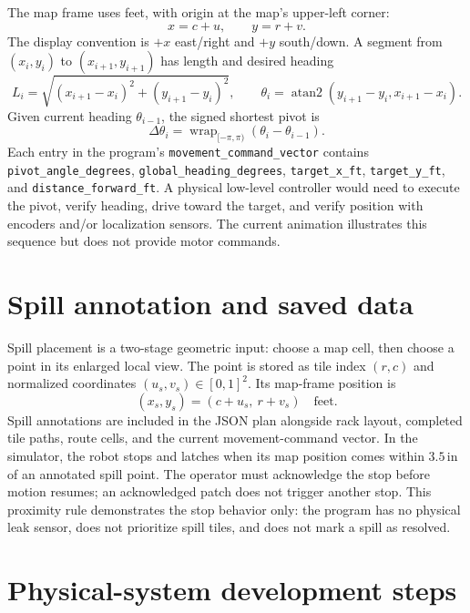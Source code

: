 \documentclass[11pt]{article}
\begin{document}
The map frame uses feet, with origin at the map's upper-left corner:
\[
  x=c+u,\qquad y=r+v.
\]
The display convention is $+x$ east/right and $+y$ south/down. A segment from
$(x_i,y_i)$ to $(x_{i+1},y_{i+1})$ has length and desired heading
\[
  L_i=\sqrt{(x_{i+1}-x_i)^2+(y_{i+1}-y_i)^2},\qquad
  \theta_i=\operatorname{atan2}(y_{i+1}-y_i,x_{i+1}-x_i).
\]
Given current heading $\theta_{i-1}$, the signed shortest pivot is
\[
  \Delta\theta_i=\operatorname{wrap}_{[-\pi,\pi)}(\theta_i-\theta_{i-1}).
\]
Each entry in the program's \texttt{movement\_command\_vector} contains
\texttt{pivot\_angle\_degrees}, \texttt{global\_heading\_degrees},
\texttt{target\_x\_ft}, \texttt{target\_y\_ft}, and
\texttt{distance\_forward\_ft}. A physical low-level controller would need
to execute the pivot, verify heading, drive toward the target, and verify
position with encoders and/or localization sensors. The current animation
illustrates this sequence but does not provide motor commands.

\section{Spill annotation and saved data}

Spill placement is a two-stage geometric input: choose a map cell, then choose
a point in its enlarged local view. The point is stored as tile index $(r,c)$
and normalized coordinates $(u_s,v_s)\in[0,1]^2$. Its map-frame position is
\[
  (x_s,y_s)=(c+u_s,\ r+v_s)\quad\text{feet}.
\]
Spill annotations are included in the JSON plan alongside rack layout,
completed tile paths, route cells, and the current movement-command vector.
In the simulator, the robot stops and latches when its map position comes
within $3.5\,\mathrm{in}$ of an annotated spill point. The operator must
acknowledge the stop before motion resumes; an acknowledged patch does not
trigger another stop. This proximity rule demonstrates the stop behavior only:
the program has no physical leak sensor, does not prioritize spill tiles, and
does not mark a spill as resolved.

\section{Physical-system development steps}
\end{document}
